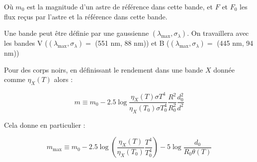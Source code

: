 \documentclass[11pt]{article} %
\begin{document}
Où $m_0$ est la magnitude d'un astre de référence dans cette bande, et $F$ et $F_0$ les flux reçus par l'astre et la référence dans cette bande.

Une bande peut être définie par une gaussienne $(\lambda_{\mbox{max}},\sigma_\lambda)$. On travaillera avec les bandes V ($(\lambda_{\mbox{max}},\sigma_\lambda) = $ (551 nm, 88 nm)) et B ($(\lambda_{\mbox{max}},\sigma_\lambda) = $ (445 nm, 94 nm))

Pour des corps noirs, en définissant le rendement dans une bande $X$ donnée comme $\eta_X(T)$ alors :

\begin{equation}
m \equiv m_0 - 2.5 \log \dfrac{\eta_X(T) \sigma T^4}{\eta_X(T_0)\sigma T_0^4} \dfrac{R^2}{R_0^2} \dfrac{d_0^2}{d^2}
\end{equation}

Cela donne en particulier :

\begin{equation}
m_{\mbox{max}} \equiv m_0 - 2.5 \log \left ( \dfrac{\eta_X(T)}{\eta_X(T_0)} \dfrac{T^4}{T_0^4}\right) - 5 \log {\dfrac{d_0}{R_0 \theta(T)}}
\end{equation}

%
%
\end{document}
